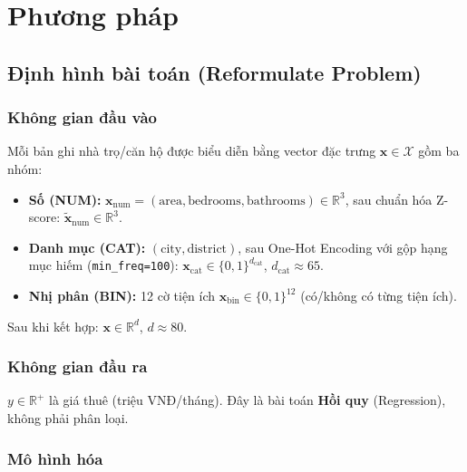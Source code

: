\section{Phương pháp}
\label{sec:method}

\subsection{Định hình bài toán (Reformulate Problem)}
\label{subsec:formulate}

\subsubsection*{Không gian đầu vào}

Mỗi bản ghi nhà trọ/căn hộ được biểu diễn bằng vector đặc trưng
$\mathbf{x} \in \mathcal{X}$ gồm ba nhóm:

\begin{itemize}[leftmargin=*, itemsep=3pt]
  \item \textbf{Số (NUM):}
        $\mathbf{x}_\text{num} = (\text{area}, \text{bedrooms}, \text{bathrooms})
        \in \mathbb{R}^3$,
        sau chuẩn hóa Z-score: $\tilde{\mathbf{x}}_\text{num} \in \mathbb{R}^3$.
  \item \textbf{Danh mục (CAT):}
        $(\text{city}, \text{district})$, sau One-Hot Encoding với gộp hạng mục hiếm
        (\texttt{min\_freq=100}): $\mathbf{x}_\text{cat} \in \{0,1\}^{d_\text{cat}}$,
        $d_\text{cat} \approx 65$.
  \item \textbf{Nhị phân (BIN):}
        12 cờ tiện ích $\mathbf{x}_\text{bin} \in \{0, 1\}^{12}$
        (có/không có từng tiện ích).
\end{itemize}

Sau khi kết hợp: $\mathbf{x} \in \mathbb{R}^{d}$, $d \approx 80$.

\subsubsection*{Không gian đầu ra}

$y \in \mathbb{R}^+$ là giá thuê (triệu VNĐ/tháng).
Đây là bài toán \textbf{Hồi quy} (Regression), không phải phân loại.

\subsubsection*{Mô hình hóa}

